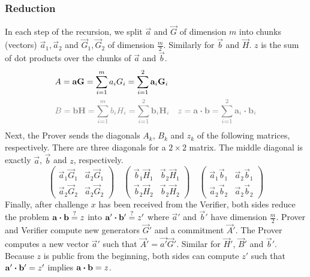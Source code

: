 \subsubsection{Reduction}

In each step of the recursion,
we split $\vec{a}$ and $\vec{G}$ of dimension $m$ into chunks (vectors)
$\vec{a}_1, \vec{a}_2$ and $\vec{G}_1, \vec{G}_2$ of dimension $\frac{m}{2}$.
%
Similarly for $\vec{b}$ and $\vec{H}$.
$z$ is the sum of dot products over the chunks of $\vec{a}$ and $\vec{b}$.
%
\begin{align*}
    &A = \vec{a}\vec{G} = \sum^{m}_{i = 1} a_iG_i = \sum^{2}_{i = 1} \vec{a}_i\vec{G}_i \\
    &\color{gray}
    B = \vec{b}\vec{H} = \sum^{m}_{i = 1} b_iH_i = \sum^{2}_{i = 1} \vec{b}_i\vec{H}_i \quad z = \vec{a} \dotprod \vec{b} = \sum^{2}_{i = 1} \vec{a}_i \dotprod \vec{b}_i
\end{align*}
%
Next, the Prover sends the diagonals $A_k$, $B_k$ and $z_k$ of the following matrices, respectively.
There are three diagonals for a $2 \times 2$ matrix.
The middle diagonal is exactly $\vec{a}$, $\vec{b}$ and $z$, respectively.
%
\[
    \begin{pmatrix}
        \vec{a}_1\vec{G}_1 & \vec{a}_2\vec{G}_1 \\
        \vec{a}_2\vec{G}_2 & \vec{a}_2\vec{G}_2
    \end{pmatrix}
    \quad
    \begin{pmatrix}
        \vec{b}_1\vec{H}_1 & \vec{b}_2\vec{H}_1 \\
        \vec{b}_2\vec{H}_2 & \vec{b}_2\vec{H}_2
    \end{pmatrix}
    \quad
    \begin{pmatrix}
        \vec{a}_1\vec{b}_1 & \vec{a}_2\vec{b}_1 \\
        \vec{a}_2\vec{b}_2 & \vec{a}_2\vec{b}_2
    \end{pmatrix}
\]
%
Finally, after challenge $x$ has been received from the Verifier,
both sides reduce the problem $\mathbf{a} \boldsymbol{\cdot} \mathbf{b} \overset{?}{=} z$ into $\mathbf{a}' \boldsymbol{\cdot} \mathbf{b}' \overset{?}{=} z'$ where $\vec{a}'$ and $\vec{b}'$ have dimension $\frac{m}{2}$.
%
Prover and Verifier compute new generators $\vec{G}'$ and a commitment $\vec{A}'$.
The Prover computes a new vector $\vec{a}'$ such that $\vec{A}' = \vec{a'}\vec{G}'$.
Similar for $\vec{H}'$, $\vec{B}'$ and $\vec{b}'$.
Because $z$ is public from the beginning, both sides can compute $z'$ such that $\mathbf{a}' \boldsymbol{\cdot} \mathbf{b}' = z'$ implies $\mathbf{a} \boldsymbol{\cdot} \mathbf{b} = z$.

